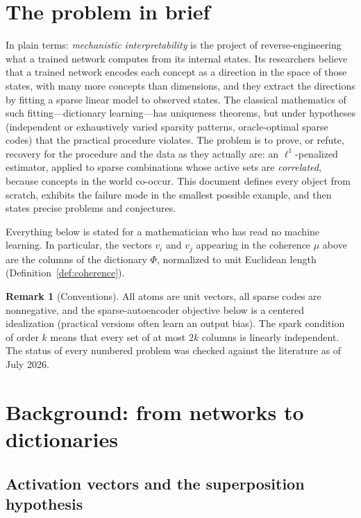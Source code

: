 \documentclass[11pt]{amsart}
\theoremstyle{plain}
\theoremstyle{definition}
\newtheorem{remark}[theorem]{Remark}
\begin{document}
\section{The problem in brief}\label{sec:brief}



In plain terms: \emph{mechanistic interpretability} is the project of reverse-engineering what a trained network computes from its internal states. Its researchers believe that a trained network encodes each concept as a direction in the space of those states, with many more concepts than dimensions, and they extract the directions by fitting a sparse linear model to observed states. The classical mathematics of such fitting---dictionary learning---has uniqueness theorems, but under hypotheses (independent or exhaustively varied sparsity patterns, oracle-optimal sparse codes) that the practical procedure violates. The problem is to prove, or refute, recovery for the procedure and the data as they actually are: an $\ell^1$-penalized estimator, applied to sparse combinations whose active sets are \emph{correlated}, because concepts in the world co-occur. This document defines every object from scratch, exhibits the failure mode in the smallest possible example, and then states precise problems and conjectures.

Everything below is stated for a mathematician who has read no machine learning. In particular, the vectors $v_i$ and $v_j$ appearing in the coherence $\mu$ above are the columns of the dictionary $\Phi$, normalized to unit Euclidean length (Definition~\ref{def:coherence}).

\begin{remark}[Conventions]
All atoms are unit vectors, all sparse codes are nonnegative, and the sparse-autoencoder objective below is a centered idealization (practical versions often learn an output bias). The spark condition of order $k$ means that every set of at most $2k$ columns is linearly independent. The status of every numbered problem was checked against the literature as of July 2026.
\end{remark}

\section{Background: from networks to dictionaries}\label{sec:background}

\subsection{Activation vectors and the superposition hypothesis}
\end{document}
